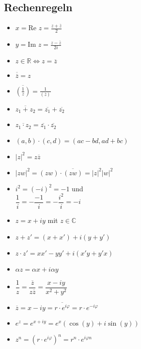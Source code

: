 \subsection{Rechenregeln}
\begin{minipage}[h]{0.45\linewidth}

\begin{itemize}[noitemsep,topsep=0pt]
\item $ x = \text{Re } z = \frac{z + \overline{z}}{2} $
\item $ y = \text{Im } z = \frac{z - \overline{z}}{2i}$
\item $ z \in \mathbb{R} \Longleftrightarrow z = \overline{z} $
\item $ \overline{\overline{z}} = z $
\item $ \overline{ \left( \frac{1}{z} \right)} = \frac{1}{(\overline{z})}$
\item $ \overline{z_1 + z_2} = \overline{z_1} + \overline{z_2}$
\item $ \overline{z_1 \cdot z_2} = \overline{z_1} \cdot \overline{z_2} $	
\item	\((a,b) \cdot (c, d)  = (ac-bd, ad+bc) \)
\item	\(|z|^2  = z\overline{z} \)
\item	\(|zw|^2  = (zw) \cdot \overline{(zw)} = |z|^2|w|^2\)
\item	\(i^2 = (-i)^2 = -1\) und \\ \( \dfrac{1}{i} = -\dfrac{-1}{i} = -\dfrac{i^2}{i} = -i \)
\end{itemize}
\end{minipage}
\hfill
\begin{minipage}[h]{0.45\linewidth}
\begin{itemize}[noitemsep,topsep=0pt]
\item	\(z=x+iy\) mit \(z \in \mathbb{C}\)
\item	\(z + z' = (x + x') + i(y + y')\)
\item	\(z \cdot z' = xx' - yy' + i(x'y + y'x)\)
\item	\(\alpha z = \alpha x + i \alpha y\)
\item	\(\dfrac{1}{z} = \dfrac{\overline{z}}{z\overline{z}} = \dfrac{x- iy}{x^2 + y^2} \)
\item	\(\overline{z} = x - iy = \overline{r\cdot e^{i\varphi}} = r\cdot e^{-i\varphi}\)
\item	\(e^z=e^{x+iy}=e^x(\cos(y)+i\sin(y))\)
\item	\(z^n = (r\cdot e^{i\varphi})^n = r^n\cdot e^{i\varphi n}\)	\\				

\end{itemize}


\end{minipage}


